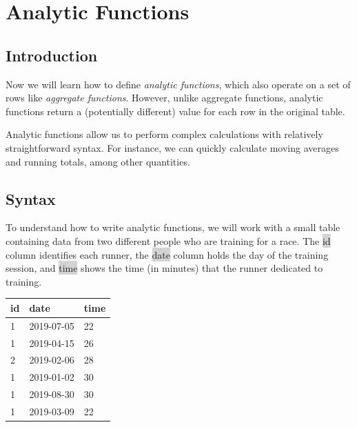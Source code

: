 \documentclass[11pt]{article}
\begin{document}
{{{{{{{\newpage
\section{Analytic Functions}
\subsection{Introduction}
Now we will learn how to define \textit{analytic functions}, which also operate on a set of rows like \textit{aggregate functions}. However, unlike aggregate functions, analytic functions return a (potentially different) value for each row in the original table.

Analytic functions allow us to perform complex calculations with relatively straightforward syntax. For instance, we can quickly calculate moving averages and running totals, among other quantities.

\subsection{Syntax}
To understand how to write analytic functions, we will work with a small table containing data from two different people who are training for a race. The \colorbox{lightgray}{id} column identifies each runner, the \colorbox{lightgray}{date} column holds the day of the training session, and \colorbox{lightgray}{time} shows the time (in minutes) that the runner dedicated to training. 
{
\begin{tabular}{ | m{13em} | m{13em} | m{13em} | }
\hline
\textbf{id} & \textbf{date} & \textbf{time} \\ 
\hline
1 & 2019-07-05 & 22 \\ 
\hline
1 & 2019-04-15 & 26 \\ 
\hline
2 & 2019-02-06 & 28 \\ 
\hline
1 & 2019-01-02 & 30 \\ 
\hline
1 & 2019-08-30 & 30 \\
\hline
1 & 2019-03-09 & 22 \\
\hline  
\end{tabular}

}}}}}}}}
\end{document}
